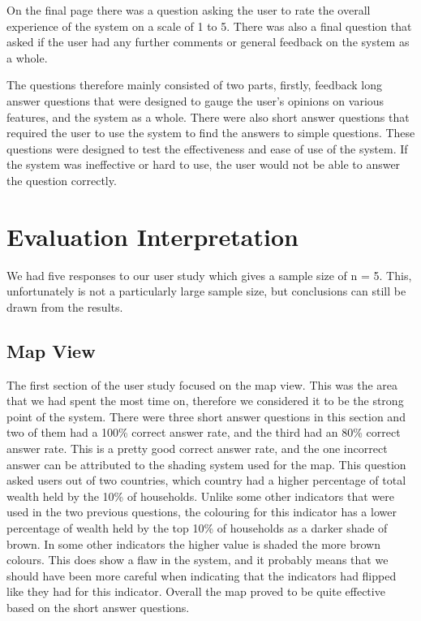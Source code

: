 \documentclass[10pt, journal]{IEEEtran}
\begin{document}
On the final page there was a question asking the user to rate the overall experience of the system on a scale of 1 to 5. There was also a final question that asked if the user had any further comments or general feedback on the system as a whole.

The questions therefore mainly consisted of two parts, firstly, feedback long answer questions that were designed to gauge the user's opinions on various features, and the system as a whole. There were also short answer questions that required the user to use the system to find the answers to simple questions. These questions were designed to test the effectiveness and ease of use of the system. If the system was ineffective or hard to use, the user would not be able to answer the question correctly.

\section{Evaluation Interpretation}

We had five responses to our user study which gives a sample size of n = 5. This, unfortunately is not a particularly large sample size, but conclusions can still be drawn from the results.

\subsection{Map View}

The first section of the user study focused on the map view. This was the area that we had spent the most time on, therefore we considered it to be the strong point of the system. There were three short answer questions in this section and two of them had a 100\% correct answer rate, and the third had an 80\% correct answer rate. This is a pretty good correct answer rate, and the one incorrect answer can be attributed to the shading system used for the map. This question asked users out of two countries, which country had a higher percentage of total wealth held by the 10\% of households. Unlike some other indicators that were used in the two previous questions, the colouring for this indicator has a lower percentage of wealth held by the top 10\% of households as a darker shade of brown. In some other indicators the higher value is shaded the more brown colours. This does show a flaw in the system, and it probably means that we should have been more careful when indicating that the indicators had flipped like they had for this indicator. Overall the map proved to be quite effective based on the short answer questions.
\end{document}
